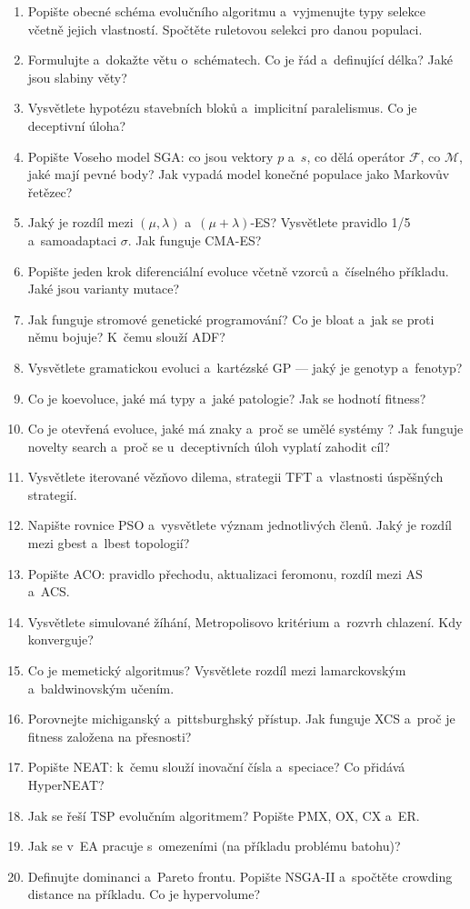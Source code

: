 \documentclass[11pt,a4paper]{article}
\theoremstyle{definition}
\begin{document}
\begin{enumerate}
\item Popište obecné schéma evolučního algoritmu a~vyjmenujte typy selekce
  včetně jejich vlastností. Spočtěte ruletovou selekci pro danou populaci.
\item Formulujte a~dokažte větu o~schématech. Co je řád a~definující délka?
  Jaké jsou slabiny věty?
\item Vysvětlete hypotézu stavebních bloků a~implicitní paralelismus.
  Co je deceptivní úloha?
\item Popište Voseho model SGA: co jsou vektory $p$ a~$s$, co dělá operátor
  $\mathcal{F}$, co $\mathcal{M}$, jaké mají pevné body? Jak vypadá model
  konečné populace jako Markovův řetězec?
\item Jaký je rozdíl mezi $(\mu,\lambda)$ a~$(\mu+\lambda)$-ES?
  Vysvětlete pravidlo 1/5 a~samoadaptaci $\sigma$. Jak funguje CMA-ES?
\item Popište jeden krok diferenciální evoluce včetně vzorců
  a~číselného příkladu. Jaké jsou varianty mutace?
\item Jak funguje stromové genetické programování? Co je bloat a~jak se proti
  němu bojuje? K~čemu slouží ADF?
\item Vysvětlete gramatickou evoluci a~kartézské GP --- jaký je genotyp
  a~fenotyp?
\item Co je koevoluce, jaké má typy a~jaké patologie? Jak se hodnotí fitness?
\item Co je otevřená evoluce, jaké má znaky a~proč se umělé systémy
  ? Jak funguje novelty search a~proč se u~deceptivních úloh
  vyplatí zahodit cíl?
\item Vysvětlete iterované vězňovo dilema, strategii TFT a~vlastnosti
  úspěšných strategií.
\item Napište rovnice PSO a~vysvětlete význam jednotlivých členů.
  Jaký je rozdíl mezi gbest a~lbest topologií?
\item Popište ACO: pravidlo přechodu, aktualizaci feromonu, rozdíl mezi
  AS a~ACS.
\item Vysvětlete simulované žíhání, Metropolisovo kritérium a~rozvrh chlazení.
  Kdy konverguje?
\item Co je memetický algoritmus? Vysvětlete rozdíl mezi lamarckovským
  a~baldwinovským učením.
\item Porovnejte michiganský a~pittsburghský přístup. Jak funguje XCS a~proč
  je fitness založena na přesnosti?
\item Popište NEAT: k~čemu slouží inovační čísla a~speciace?
  Co přidává HyperNEAT?
\item Jak se řeší TSP evolučním algoritmem? Popište PMX, OX, CX a~ER.
\item Jak se v~EA pracuje s~omezeními (na příkladu problému batohu)?
\item Definujte dominanci a~Pareto frontu. Popište NSGA-II a~spočtěte
  crowding distance na příkladu. Co je hypervolume?
\end{enumerate}
\end{document}
